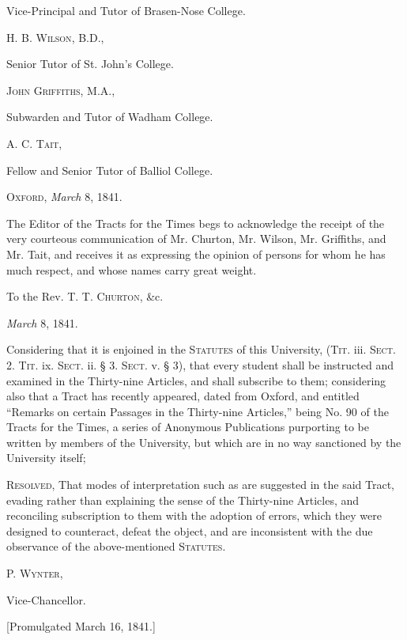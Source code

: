 Vice-Principal and Tutor of Brasen-Nose College.

H. B. W\textsc{ilson}, B.D.,

Senior Tutor of St. John's College.

J\textsc{ohn} G\textsc{riffiths}, M.A.,

Subwarden and Tutor of Wadham College.

A. C. T\textsc{ait},

Fellow and Senior Tutor of Balliol College.

O\textsc{xford}, \emph{March} 8, 1841.


The Editor of the Tracts for the Times begs to acknowledge the
receipt of the very courteous communication of Mr. Churton, Mr.
Wilson, Mr. Griffiths, and Mr. Tait, and receives it as expressing the
opinion of persons for whom he has much respect, and whose names carry
great weight.

To the Rev. T. T. C\textsc{hurton}, \&c.

\emph{March} 8, 1841.


Considering that it is enjoined in the S\textsc{tatutes} of this University,
(T\textsc{it}. iii. S\textsc{ect}. 2. T\textsc{it}.
ix. S\textsc{ect}. ii. § 3. S\textsc{ect}.
v. § 3), that every student shall be instructed and examined in the
Thirty-nine Articles, and shall subscribe to them; considering also
that a Tract has recently appeared, dated from Oxford, and entitled
``Remarks on certain Passages in the Thirty-nine Articles,''
being No. 90 of the Tracts for the Times, a series of Anonymous
Publications purporting to be written by members of the University,
but which are in no way sanctioned by the University itself;

R\textsc{esolved}, That modes of interpretation such
as are suggested in the said Tract, evading rather than explaining the
sense of the Thirty-nine Articles, and reconciling subscription to
them with the adoption of errors, which they were designed to
counteract, defeat the object, and are inconsistent with the due
observance of the above-mentioned S\textsc{tatutes}.

P. W\textsc{ynter},

Vice-Chancellor.

[Promulgated March 16, 1841.]

